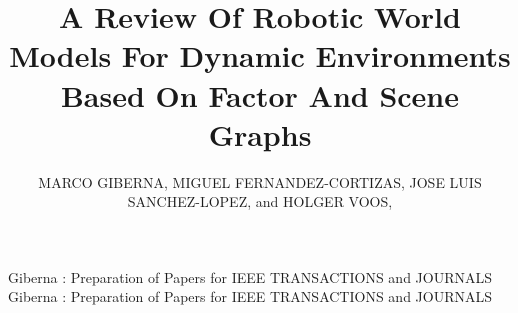 \documentclass{ieeeaccess}
\begin{document}

\title{A Review Of Robotic World Models For Dynamic Environments Based On Factor And Scene Graphs}
\author{\uppercase{Marco Giberna}, \uppercase{Miguel Fernandez-Cortizas},
\uppercase{Jose Luis Sanchez-Lopez}, and \uppercase{Holger Voos},
}
\address[1]{Automation and Robotics Research Group, Interdisciplinary Centre for Security, Reliability and Trust (SnT), University of Luxembourg, 1855 Luxembourg, Luxembourg}
\address[2]{Faculty of Science, Technology and Medicine, University of Luxembourg, 4365 Esch-sur-Alzette, Luxembourg}

\markboth
{Giberna \headeretal: Preparation of Papers for IEEE TRANSACTIONS and JOURNALS}
{Giberna \headeretal: Preparation of Papers for IEEE TRANSACTIONS and JOURNALS}

\end{document}
